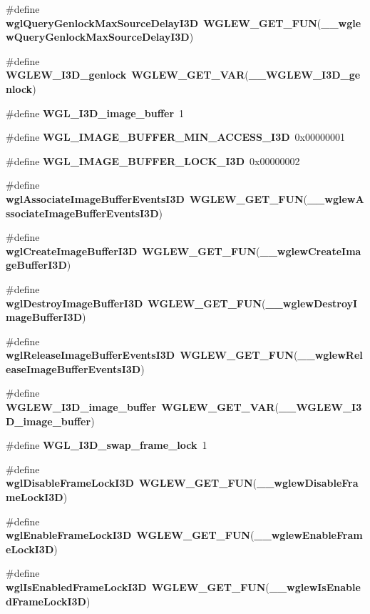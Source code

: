 \begin{DoxyCompactItemize}
\item 
\#define {\bf wgl\+Query\+Genlock\+Max\+Source\+Delay\+I3D}~{\bf W\+G\+L\+E\+W\+\_\+\+G\+E\+T\+\_\+\+F\+UN}({\bf \+\_\+\+\_\+wglew\+Query\+Genlock\+Max\+Source\+Delay\+I3D})
\item 
\#define {\bf W\+G\+L\+E\+W\+\_\+\+I3\+D\+\_\+genlock}~{\bf W\+G\+L\+E\+W\+\_\+\+G\+E\+T\+\_\+\+V\+AR}({\bf \+\_\+\+\_\+\+W\+G\+L\+E\+W\+\_\+\+I3\+D\+\_\+genlock})
\item 
\#define {\bf W\+G\+L\+\_\+\+I3\+D\+\_\+image\+\_\+buffer}~1
\item 
\#define {\bf W\+G\+L\+\_\+\+I\+M\+A\+G\+E\+\_\+\+B\+U\+F\+F\+E\+R\+\_\+\+M\+I\+N\+\_\+\+A\+C\+C\+E\+S\+S\+\_\+\+I3D}~0x00000001
\item 
\#define {\bf W\+G\+L\+\_\+\+I\+M\+A\+G\+E\+\_\+\+B\+U\+F\+F\+E\+R\+\_\+\+L\+O\+C\+K\+\_\+\+I3D}~0x00000002
\item 
\#define {\bf wgl\+Associate\+Image\+Buffer\+Events\+I3D}~{\bf W\+G\+L\+E\+W\+\_\+\+G\+E\+T\+\_\+\+F\+UN}({\bf \+\_\+\+\_\+wglew\+Associate\+Image\+Buffer\+Events\+I3D})
\item 
\#define {\bf wgl\+Create\+Image\+Buffer\+I3D}~{\bf W\+G\+L\+E\+W\+\_\+\+G\+E\+T\+\_\+\+F\+UN}({\bf \+\_\+\+\_\+wglew\+Create\+Image\+Buffer\+I3D})
\item 
\#define {\bf wgl\+Destroy\+Image\+Buffer\+I3D}~{\bf W\+G\+L\+E\+W\+\_\+\+G\+E\+T\+\_\+\+F\+UN}({\bf \+\_\+\+\_\+wglew\+Destroy\+Image\+Buffer\+I3D})
\item 
\#define {\bf wgl\+Release\+Image\+Buffer\+Events\+I3D}~{\bf W\+G\+L\+E\+W\+\_\+\+G\+E\+T\+\_\+\+F\+UN}({\bf \+\_\+\+\_\+wglew\+Release\+Image\+Buffer\+Events\+I3D})
\item 
\#define {\bf W\+G\+L\+E\+W\+\_\+\+I3\+D\+\_\+image\+\_\+buffer}~{\bf W\+G\+L\+E\+W\+\_\+\+G\+E\+T\+\_\+\+V\+AR}({\bf \+\_\+\+\_\+\+W\+G\+L\+E\+W\+\_\+\+I3\+D\+\_\+image\+\_\+buffer})
\item 
\#define {\bf W\+G\+L\+\_\+\+I3\+D\+\_\+swap\+\_\+frame\+\_\+lock}~1
\item 
\#define {\bf wgl\+Disable\+Frame\+Lock\+I3D}~{\bf W\+G\+L\+E\+W\+\_\+\+G\+E\+T\+\_\+\+F\+UN}({\bf \+\_\+\+\_\+wglew\+Disable\+Frame\+Lock\+I3D})
\item 
\#define {\bf wgl\+Enable\+Frame\+Lock\+I3D}~{\bf W\+G\+L\+E\+W\+\_\+\+G\+E\+T\+\_\+\+F\+UN}({\bf \+\_\+\+\_\+wglew\+Enable\+Frame\+Lock\+I3D})
\item 
\#define {\bf wgl\+Is\+Enabled\+Frame\+Lock\+I3D}~{\bf W\+G\+L\+E\+W\+\_\+\+G\+E\+T\+\_\+\+F\+UN}({\bf \+\_\+\+\_\+wglew\+Is\+Enabled\+Frame\+Lock\+I3D})

\end{DoxyCompactItemize}
